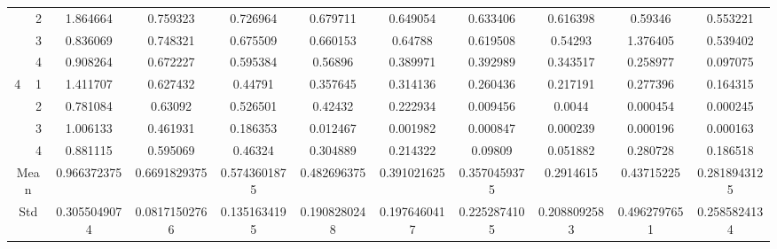 \documentclass[draft,dvipsnames]{drexel-thesis}
\begin{document}
\begin{thesis}
\begin{table}[!t]
{\begin{tabular}{|c|c|c|c|c|c|c|c|c|c|c|}
                      & 2                   & 1.864664     & 0.759323      & 0.726964     & 0.679711     & 0.649054     & 0.633406     & 0.616398     & 0.59346      & 0.553221     \\ \cline{2-11} 
                      & 3                   & 0.836069     & 0.748321      & 0.675509     & 0.660153     & 0.64788      & 0.619508     & 0.54293      & 1.376405     & 0.539402     \\ \cline{2-11} 
                      & 4                   & 0.908264     & 0.672227      & 0.595384     & 0.56896      & 0.389971     & 0.392989     & 0.343517     & 0.258977     & 0.097075     \\ \hline
\multirow{4}{*}{4}    & 1                   & 1.411707     & 0.627432      & 0.44791      & 0.357645     & 0.314136     & 0.260436     & 0.217191     & 0.277396     & 0.164315     \\ \cline{2-11} 
                      & 2                   & 0.781084     & 0.63092       & 0.526501     & 0.42432      & 0.222934     & 0.009456     & 0.0044       & 0.000454     & 0.000245     \\ \cline{2-11} 
                      & 3                   & 1.006133     & 0.461931      & 0.186353     & 0.012467     & 0.001982     & 0.000847     & 0.000239     & 0.000196     & 0.000163     \\ \cline{2-11} 
                      & 4                   & 0.881115     & 0.595069      & 0.46324      & 0.304889     & 0.214322     & 0.09809      & 0.051882     & 0.280728     & 0.186518     \\ \hline
\multicolumn{2}{|c|}{Mean}                  & 0.966372375  & 0.6691829375  & 0.5743601875 & 0.482696375  & 0.391021625  & 0.3570459375 & 0.2914615    & 0.43715225   & 0.2818943125 \\ \hline
\multicolumn{2}{|c|}{Std}                   & 0.3055049074 & 0.08171502766 & 0.1351634195 & 0.1908280248 & 0.1976460417 & 0.2252874105 & 0.2088092583 & 0.4962797651 & 0.2585824134 \\ \hline
\end{tabular}}
\end{table}


\end{thesis}
\end{document}

